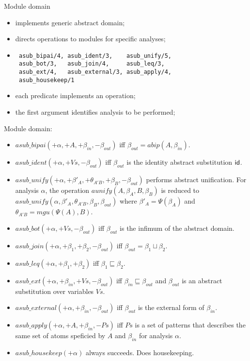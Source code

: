 \documentclass[landscape]{slides}
\def\aleq{{\sqsubseteq}}
\newcommand{\alub}  {{\sqcup}}
\newcommand{\aunify}   {{aunify}}
\newcommand{\asubid} {{\sf id}}
\begin{document}
 \begin{slide} {Module {\sf domain}}

 \begin{itemize}
 \item implements generic abstract domain;
 \item directs operations to modules for specific analyses;
 \item \begin{verbatim} 
 asub_bipai/4, asub_ident/3,    asub_unify/5, 
 asub_bot/3,   asub_join/4,     asub_leq/3,
 asub_ext/4,   asub_external/3, asub_apply/4, 
 asub_housekeep/1 \end{verbatim}
 \item each predicate implements an operation;
 \item the first argument identifies analysis to be performed;
 \end{itemize}

 \end{slide}

 \begin{slide} Module {\sf domain}:
 \begin{itemize} 
 \item $asub\_bipai(+\alpha,+A,+\beta_{in},-\beta_{out})$ iff
 $\beta_{out}=abip(A,\beta_{in})$.
 \item $asub\_ident(+\alpha,+Vs,-\beta_{out})$ iff $\beta_{out}$ is the
 identity abstract substitution $\asubid$.
 \item
 $asub\_unify(+\alpha,+\beta'_{A},+\theta_{A'B},+\beta_{B},-\beta_{out})$
 performs abstract unification. For analysis $\alpha$, the operation
 $\aunify(A,\beta_A,B,\beta_B)$ is reduced to
 $asub\_unify(\alpha,\beta'_{A},\theta_{A'B},\beta_{B},\beta_{out})$
 where $\beta'_{A}=\Psi(\beta_{A})$ and $\theta_{A'B}=mgu(\Psi(A),B)$.
 \item $asub\_bot(+\alpha,+Vs,-\beta_{out})$ iff $\beta_{out}$ is the
   infimum of the abstract domain.
 \item $asub\_join(+\alpha,+\beta_{1},+\beta_{2},-\beta_{out})$ iff 
       $\beta_{out}=\beta_{1}\alub\beta_{2}$.
 \item $asub\_leq(+\alpha,+\beta_{1},+\beta_{2})$ iff
       $\beta_{1}\aleq\beta_{2}$.
 \item $asub\_ext(+\alpha,+\beta_{in},+Vs,-\beta_{out})$ iff
 $\beta_{in}\aleq\beta_{out}$ and $\beta_{out}$ is an abstract substitution
 over variables $Vs$. 
 \item $asub\_external(+\alpha,+\beta_{in},-\beta_{out})$ iff $\beta_{out}$
       is the external form of $\beta_{in}$. 
 \item $asub\_apply(+\alpha,+A,+\beta_{in},-Ps)$ iff $Ps$ is a set of
 patterns that describes the same set of atoms speficied by $A$ and
 $\beta_{in}$ for analysis $\alpha$. 
 \item $asub\_housekeep(+\alpha)$ always succeeds. 
 Does housekeeping. 
 \end{itemize}
 \end{slide}
\end{document}
